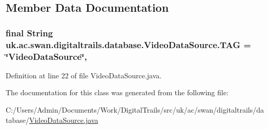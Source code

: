 \subsection{Member Data Documentation}
\hypertarget{classuk_1_1ac_1_1swan_1_1digitaltrails_1_1database_1_1_video_data_source_ac59703db55c1abb45784aaf3cc01d59f}{
\subsubsection[{T\+A\+G}]{\setlength{\rightskip}{0pt plus 5cm}final String uk.\+ac.\+swan.\+digitaltrails.\+database.\+Video\+Data\+Source.\+T\+A\+G = \char`\"{}Video\+Data\+Source\char`\"{}\hspace{0.3cm}{\ttfamily [static]}, {\ttfamily [private]}}}\label{classuk_1_1ac_1_1swan_1_1digitaltrails_1_1database_1_1_video_data_source_ac59703db55c1abb45784aaf3cc01d59f}


Definition at line 22 of file Video\+Data\+Source.\+java.



The documentation for this class was generated from the following file\+:\begin{DoxyCompactItemize}
\item 
C\+:/\+Users/\+Admin/\+Documents/\+Work/\+Digital\+Trails/src/uk/ac/swan/digitaltrails/database/\hyperlink{_video_data_source_8java}{Video\+Data\+Source.\+java}\end{DoxyCompactItemize}
